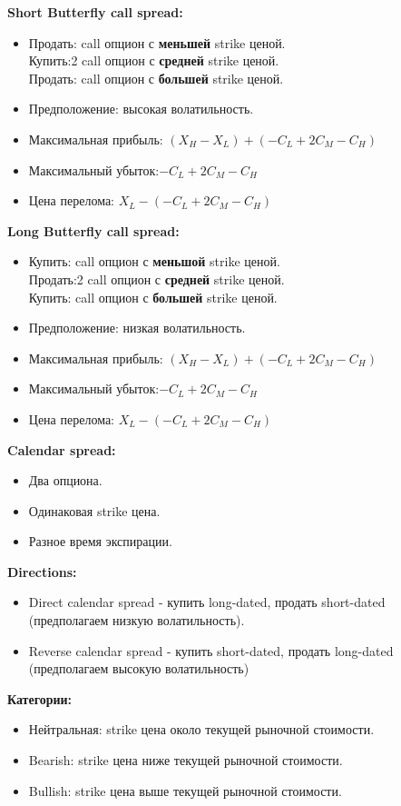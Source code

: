 \documentclass{article}
\begin{document}
 \textbf{Short Butterfly call spread:}
 \begin{itemize}
 \item Продать: call опцион с \textbf{меньшей} strike ценой.\\
Купить:2  call опцион с \textbf{средней} strike ценой.\\Продать: call опцион с \textbf{большей} strike ценой.
\item Предположение: высокая волатильность.
\item Максимальная прибыль: $(X_H - X_L) + (-C_L +2C_M -C_H) $
\item Максимальный убыток:$ -C_L +2C_M -C_H $
\item Цена перелома: $ X_L - (-C_L + 2C_M - C_H) $
\end{itemize}


 \textbf{Long Butterfly call spread:}
 \begin{itemize}
 \item Купить: call опцион с \textbf{меньшой} strike ценой.\\
Продать:2  call опцион с \textbf{средней} strike ценой.\\Купить: call опцион с \textbf{большей} strike ценой.
\item Предположение: низкая волатильность.
\item Максимальная прибыль: $(X_H - X_L) + (-C_L +2C_M -C_H) $
\item Максимальный убыток:$ -C_L +2C_M -C_H $
\item Цена перелома: $ X_L - (-C_L + 2C_M - C_H) $
\end{itemize}

\textbf{Calendar spread:}
 \begin{itemize}
 \item Два опциона.
\item Одинаковая strike цена.
\item Разное время экспирации.
\end{itemize}
\textbf{Directions:}
 \begin{itemize}
 \item Direct calendar spread - купить long-dated, продать short-dated (предполагаем низкую волатильность).
\item Reverse calendar spread - купить short-dated, продать long-dated (предполагаем высокую волатильность) 
\end{itemize}

\textbf{Категории:}
 \begin{itemize}
 \raggedright
\item Нейтральная: strike цена около текущей рыночной стоимости.
\item Bearish: strike цена ниже текущей рыночной стоимости.
\item Bullish: strike цена выше текущей рыночной стоимости.
\end{itemize}
\newpage
\end{document}
